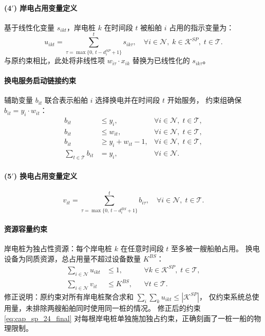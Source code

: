 \documentclass[UTF8, a4paper, 12pt]{ctexart}
\begin{document}
\paragraph{(4$'$) 岸电占用变量定义}
基于线性化变量 $s_{ikt}$，岸电桩 $k$ 在时间段 $t$ 被船舶 $i$ 占用的指示变量为：
\begin{equation}
u_{ikt} = \sum_{\tau = \max\{0,\, t-d_i^{SP}+1\}}^{t} s_{ik\tau},
\quad \forall i \in \mathcal{N},\; k \in \mathcal{K}^{SP},\; t \in \mathcal{T}.
\label{eq:link_sp_24_final}
\end{equation}
与原约束相比，此处将非线性项 $w_{i\tau} \cdot x_{ik}$ 替换为已线性化的 $s_{ik\tau}$。

\paragraph{换电服务启动链接约束}
辅助变量 $b_{it}$ 联合表示船舶 $i$ 选择换电并在时间段 $t$ 开始服务，
约束组确保 $b_{it} = y_i \cdot w_{it}$：
\begin{align}
b_{it} &\le y_i,
  & \forall i \in \mathcal{N},\; t \in \mathcal{T},
  \label{eq:lin_bs_a} \\
b_{it} &\le w_{it},
  & \forall i \in \mathcal{N},\; t \in \mathcal{T},
  \label{eq:lin_bs_b} \\
b_{it} &\ge y_i + w_{it} - 1,
  & \forall i \in \mathcal{N},\; t \in \mathcal{T},
  \label{eq:lin_bs_c} \\
\sum_{t \in \mathcal{T}} b_{it} &= y_i,
  & \forall i \in \mathcal{N}.
  \label{eq:lin_bs_d}
\end{align}

\paragraph{(5$'$) 换电占用变量定义}
\begin{equation}
v_{it} = \sum_{\tau = \max\{0,\, t-d_i^{BS}+1\}}^{t} b_{i\tau},
\quad \forall i \in \mathcal{N},\; t \in \mathcal{T}.
\label{eq:link_bs_24_final}
\end{equation}

\paragraph{资源容量约束}
岸电桩为独占性资源：每个岸电桩 $k$ 在任意时间段 $t$ 至多被一艘船舶占用。
换电设备为同质资源，总占用量不超过设备数量 $K^{BS}$：
\begin{align}
\sum_{i \in \mathcal{N}} u_{ikt}
&\le 1,
&& \forall k \in \mathcal{K}^{SP},\; t \in \mathcal{T},
\label{eq:cap_sp_24_final} \\
\sum_{i \in \mathcal{N}} v_{it}
&\le K^{BS},
&& \forall t \in \mathcal{T}.
\label{eq:cap_bs_24_final}
\end{align}
修正说明：原约束对所有岸电桩聚合求和 $\sum_{i} \sum_{k} u_{ikt} \le |\mathcal{K}^{SP}|$，
仅约束系统总使用量，未排除两艘船舶同时使用同一桩的情况。
修正后的约束 \eqref{eq:cap_sp_24_final} 对每根岸电桩单独施加独占约束，正确刻画了一桩一船的物理限制。
\end{document}
